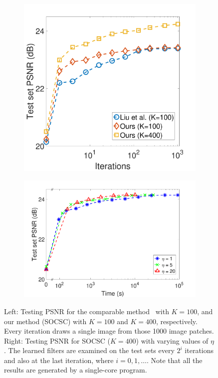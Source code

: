 \begin{figure}[h]
\centering
\begin{subfigure}{0.41\textwidth}
  \includegraphics[width=1\linewidth]{figure/overComplete-ite.pdf}
\end{subfigure} 
\begin{subfigure}{0.58\textwidth}
  \includegraphics[width=1\linewidth]{figure/minibatch.pdf}
\end{subfigure}

\caption{Left: Testing PSNR for the comparable method~\cite{liu-2018-first} with $K=100$, and our method (SOCSC) with $K=100$ and $K=400$, respectively. Every iteration draws a single image from those 1000 image patches. Right: Testing PSNR for SOCSC ($K=400$) with varying values of $\eta$. The learned filters are examined on the test sets every $2^i$ iterations and also at the last iteration, where $i=0,1,\dots$. Note that all the results are generated by a single-core program.}
\label{fig:overComDicAndMinibatch}
\end{figure}

